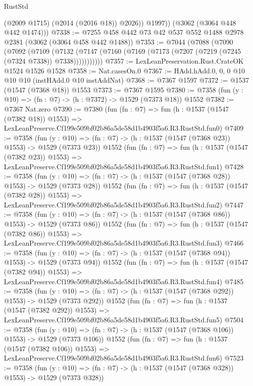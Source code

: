 \begin{lexlean}{RustStd}
\begin{coremodule}
              (@2009 @1715)
              (@2014 (@2016 @18))
              @2026))
          @1997))
      (@3062 (@3064 @448 @442 @1474)))
@7338 := @7255 @458 @442 @73 @42 @537 @552 @1488 @2978 @2381 (@3062 (@3064 @458 @442 @1488))
@7353 := @7044
    (@7088
      (@7090
        (@7092
          (@7109
            (@7132 (@7147 (@7160 (@7169 (@7173 (@7207 (@7219 (@7245 (@7324 @7338)) @7338)))))))))))
@7357 := LexLeanPreservation.Rust.CrateOK @1524 @1526 @1528
@7358 := Nat.casesOn.{0}
@7367 := HAdd.hAdd.{0, 0, 0} @10 @10 @10 (instHAdd.{0} @10 instAddNat)
@7368 := @7367 @1597
@7372 := @1537 (@1547 (@7368 @18)) @1553
@7373 := @7367 @1595
@7380 := @7358 (fun (y : @10) => (fn : @7) -> (h : @7372) -> @1529 (@7373 @18)) @1552
@7382 := @7367 Nat.zero
@7390 := @7380
    (fun (fn : @7) =>
    fun (h : @1537 (@1547 (@7382 @18)) @1553) =>
    LexLeanPreserve.Cf199e509bf02b86a5de58d1b4903f5a6.R3.RustStd.fun0)
@7409 := @7358
    (fun (y : @10) => (fn : @7) -> (h : @1537 (@1547 (@7368 @23)) @1553) -> @1529 (@7373 @23))
    @1552
    (fun (fn : @7) =>
    fun (h : @1537 (@1547 (@7382 @23)) @1553) =>
    LexLeanPreserve.Cf199e509bf02b86a5de58d1b4903f5a6.R3.RustStd.fun1)
@7428 := @7358
    (fun (y : @10) => (fn : @7) -> (h : @1537 (@1547 (@7368 @28)) @1553) -> @1529 (@7373 @28))
    @1552
    (fun (fn : @7) =>
    fun (h : @1537 (@1547 (@7382 @28)) @1553) =>
    LexLeanPreserve.Cf199e509bf02b86a5de58d1b4903f5a6.R3.RustStd.fun2)
@7447 := @7358
    (fun (y : @10) => (fn : @7) -> (h : @1537 (@1547 (@7368 @86)) @1553) -> @1529 (@7373 @86))
    @1552
    (fun (fn : @7) =>
    fun (h : @1537 (@1547 (@7382 @86)) @1553) =>
    LexLeanPreserve.Cf199e509bf02b86a5de58d1b4903f5a6.R3.RustStd.fun3)
@7466 := @7358
    (fun (y : @10) => (fn : @7) -> (h : @1537 (@1547 (@7368 @94)) @1553) -> @1529 (@7373 @94))
    @1552
    (fun (fn : @7) =>
    fun (h : @1537 (@1547 (@7382 @94)) @1553) =>
    LexLeanPreserve.Cf199e509bf02b86a5de58d1b4903f5a6.R3.RustStd.fun4)
@7485 := @7358
    (fun (y : @10) => (fn : @7) -> (h : @1537 (@1547 (@7368 @292)) @1553) -> @1529 (@7373 @292))
    @1552
    (fun (fn : @7) =>
    fun (h : @1537 (@1547 (@7382 @292)) @1553) =>
    LexLeanPreserve.Cf199e509bf02b86a5de58d1b4903f5a6.R3.RustStd.fun5)
@7504 := @7358
    (fun (y : @10) => (fn : @7) -> (h : @1537 (@1547 (@7368 @106)) @1553) -> @1529 (@7373 @106))
    @1552
    (fun (fn : @7) =>
    fun (h : @1537 (@1547 (@7382 @106)) @1553) =>
    LexLeanPreserve.Cf199e509bf02b86a5de58d1b4903f5a6.R3.RustStd.fun6)
@7523 := @7358
    (fun (y : @10) => (fn : @7) -> (h : @1537 (@1547 (@7368 @328)) @1553) -> @1529 (@7373 @328))

\end{coremodule}
\end{lexlean}
